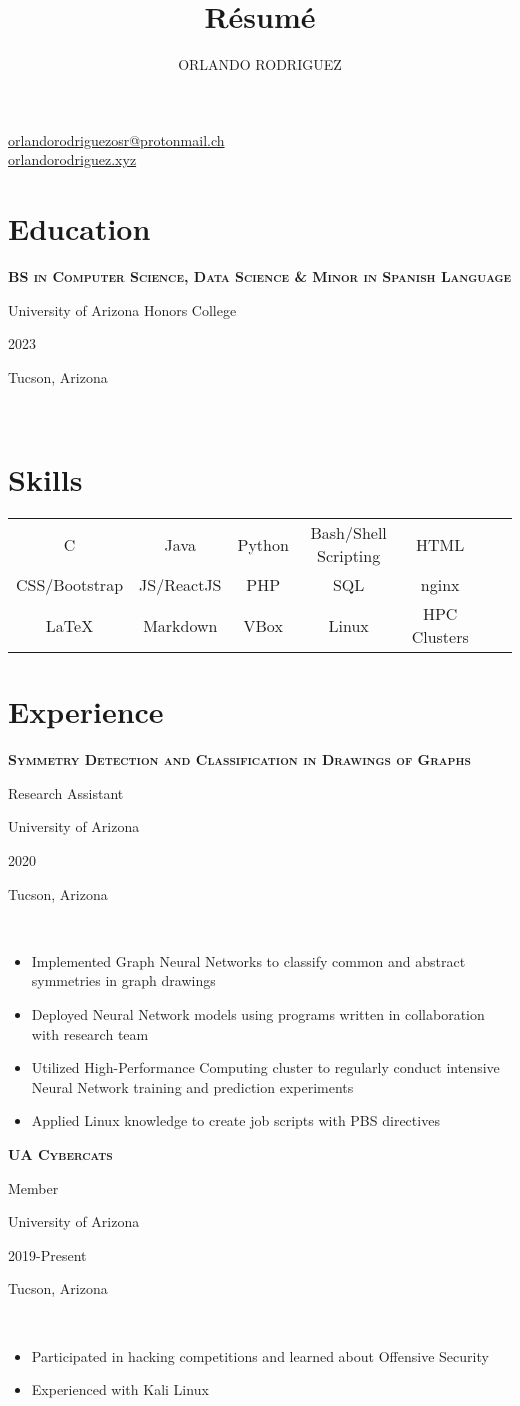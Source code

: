 \documentclass[letterpaper,10pt]{article}
\makeatletter
\newcommand{\entry}[5]{
    \hfill\vline\hfill
    \begin{minipage}[t]{.80\textwidth}
    
        \textbf{\textsc{#3}}
        
        #4
        
        \footnotesize{#1}
    \end{minipage}
    \hfill\vline\hfill
    \begin{minipage}[t]{.15\textwidth}
        #2
        
        \footnotesize{#5}
    \end{minipage}\\\vspace{.1cm}
}
\newcommand{\ua}{University of Arizona}
\newcommand{\uahc}{University of Arizona Honors College}
\newcommand{\town}{Tucson, Arizona}
\newcommand{\contact}{\href{mailto:orlandorodriguezosr@protonmail.ch}{orlandorodriguezosr@protonmail.ch}}
\newcommand{\site}{\href{https://www.orlandorodriguez.xyz}{orlandorodriguez.xyz}}
\renewcommand{\maketitle}{
\begin{center}
{\LARGE
\theauthor}
\vspace{.1em}

\contact\\\site

\end{center}
}
\makeatother
\begin{document}
\title{R\'esum\'e}
\author{ORLANDO RODRIGUEZ}

\maketitle
\section{Education}
\entry{\uahc}{2023}{BS in Computer Science, Data Science \& Minor in Spanish Language}{}{\town}

\section{Skills}
\begin{center}
\setlength{\tabcolsep}{10pt} %
\renewcommand{\arraystretch}{1.5} %
\begin{tabular}{ccccccc}
 C & Java & Python & Bash/Shell Scripting &HTML \\
 CSS/Bootstrap & JS/ReactJS & PHP & SQL & nginx\\
{\LaTeX} & Markdown & VBox & Linux & HPC Clusters\\

\end{tabular}
\end{center}

\section{Experience}

\entry{\ua}{2020}{Symmetry Detection and Classification in Drawings of Graphs}{Research Assistant}{\town}
\begin{itemize}
   	\item Implemented Graph Neural Networks to classify common and abstract symmetries in graph drawings
    \item Deployed Neural Network models using programs written in collaboration with research team
    \item Utilized High-Performance Computing cluster to regularly conduct intensive Neural Network training and prediction experiments
	\item Applied Linux knowledge to create job scripts with PBS directives
\end{itemize}

\entry{\ua}{2019-Present}{UA Cybercats}{Member}{\town}
\begin{itemize}
    \item Participated in hacking competitions and learned about Offensive Security
	\item Experienced with Kali Linux
\end{itemize}
\end{document}
